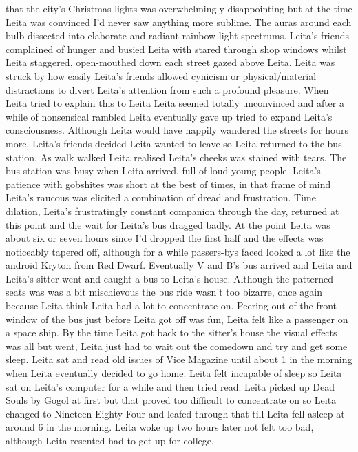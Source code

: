 \documentclass[12pt]{book}
\begin{document}
that the city's Christmas lights was overwhelmingly disappointing but at the time Leita was convinced I'd never saw anything more sublime. The auras around each bulb dissected into elaborate and radiant rainbow light spectrums. Leita's friends complained of hunger and busied Leita with stared through shop windows whilst Leita staggered, open-mouthed down each street gazed above Leita. Leita was struck by how easily Leita's friends allowed cynicism or physical/material distractions to divert Leita's attention from such a profound pleasure. When Leita tried to explain this to Leita Leita seemed totally unconvinced and after a while of nonsensical rambled Leita eventually gave up tried to expand Leita's consciousness. Although Leita would have happily wandered the streets for hours more, Leita's friends decided Leita wanted to leave so Leita returned to the bus station. As walk walked Leita realised Leita's cheeks was stained with tears. The bus station was busy when Leita arrived, full of loud young people. Leita's patience with gobshites was short at the best of times, in that frame of mind Leita's raucous was elicited a combination of dread and frustration. Time dilation, Leita's frustratingly constant companion through the day, returned at this point and the wait for Leita's bus dragged badly. At the point Leita was about six or seven hours since I'd dropped the first half and the effects was noticeably tapered off, although for a while passers-bys faced looked a lot like the android Kryton from Red Dwarf. Eventually V and B's bus arrived and Leita and Leita's sitter went and caught a bus to Leita's house. Although the patterned seats was was a bit mischievous the bus ride wasn't too bizarre, once again because Leita think Leita had a lot to concentrate on. Peering out of the front window of the bus just before Leita got off was fun, Leita felt like a passenger on a space ship. By the time Leita got back to the sitter's house the visual effects was all but went, Leita just had to wait out the comedown and try and get some sleep. Leita sat and read old issues of Vice Magazine until about 1 in the morning when Leita eventually decided to go home. Leita felt incapable of sleep so Leita sat on Leita's computer for a while and then tried read. Leita picked up Dead Souls by Gogol at first but that proved too difficult to concentrate on so Leita changed to Nineteen Eighty Four and leafed through that till Leita fell asleep at around 6 in the morning. Leita woke up two hours later not felt too bad, although Leita resented had to get up for college.
\end{document}
